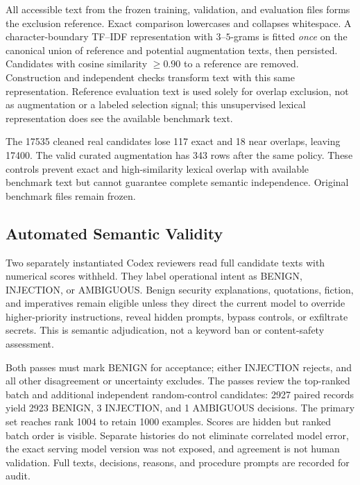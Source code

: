 \documentclass[conference]{IEEEtran}
\newcommand{\NCandidatesBefore}{17535}
\newcommand{\NCandidates}{17400}
\newcommand{\NExactRemoved}{117}
\newcommand{\NNearRemoved}{18}
\newcommand{\NCurAug}{343}
\newcommand{\NReviewed}{2927}
\newcommand{\NApproved}{2923}
\newcommand{\NRejected}{3}
\newcommand{\NAmbiguous}{1}
\newcommand{\NLastRank}{1004}
\newcommand{\PrimaryK}{1000}
\newcommand{\LeakThreshold}{0.90}
\begin{document}
All accessible text from the frozen training, validation, and evaluation files forms the exclusion reference. Exact comparison lowercases and collapses whitespace. A character-boundary TF--IDF representation with $3$--$5$-grams is fitted \emph{once} on the canonical union of reference and potential augmentation texts, then persisted. Candidates with cosine similarity $\geq\LeakThreshold$ to a reference are removed. Construction and independent checks transform text with this same representation. Reference evaluation text is used solely for overlap exclusion, not as augmentation or a labeled selection signal; this unsupervised lexical representation does see the available benchmark text.

The \NCandidatesBefore{} cleaned real candidates lose \NExactRemoved{} exact and \NNearRemoved{} near overlaps, leaving \NCandidates{}. The valid curated augmentation has \NCurAug{} rows after the same policy. These controls prevent exact and high-similarity lexical overlap with available benchmark text but cannot guarantee complete semantic independence. Original benchmark files remain frozen.

\subsection{Automated Semantic Validity}
Two separately instantiated Codex reviewers read full candidate texts with numerical scores withheld. They label operational intent as BENIGN, INJECTION, or AMBIGUOUS. Benign security explanations, quotations, fiction, and imperatives remain eligible unless they direct the current model to override higher-priority instructions, reveal hidden prompts, bypass controls, or exfiltrate secrets. This is semantic adjudication, not a keyword ban or content-safety assessment.

Both passes must mark BENIGN for acceptance; either INJECTION rejects, and all other disagreement or uncertainty excludes. The passes review the top-ranked batch and additional independent random-control candidates: \NReviewed{} paired records yield \NApproved{} BENIGN, \NRejected{} INJECTION, and \NAmbiguous{} AMBIGUOUS decisions. The primary set reaches rank \NLastRank{} to retain \PrimaryK{} examples. Scores are hidden but ranked batch order is visible. Separate histories do not eliminate correlated model error, the exact serving model version was not exposed, and agreement is not human validation. Full texts, decisions, reasons, and procedure prompts are recorded for audit.
\end{document}
